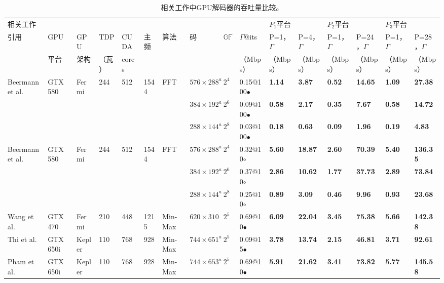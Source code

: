 \documentclass{cjc}
\begin{document}
\begin{table}
  \caption{相关工作中GPU解码器的吞吐量比较。}
  \label{tab:5}
  \small
  \setlength\tabcolsep{4pt}%
  \begin{tabular}{llllllllllllllll}
    \toprule
    相关工作&&&&&&&&&&\multicolumn{2}{l}{$P_1$平台}&\multicolumn{2}{l}{$P_2$平台}&\multicolumn{2}{l}{$P_3$平台}\\
    \cmidrule(r){11-12}\cmidrule(r){13-14}\cmidrule(r){15-16}%
    引用&GPU&GPU&TDP&CUDA&主频&算法&码&$\mathbb{GF}$&$\Gamma$@its&P=1，$\Gamma$&P=4，$\Gamma$&P=1，$\Gamma$&P=24，$\Gamma$&P=1，$\Gamma$&P=28，$\Gamma$\\
    &平台&架构&（瓦）&cores&&&&&（Mbps）&（Mbps）&（Mbps）&（Mbps）&（Mbps）&（Mbps）&（Mbps）\\
    \midrule
    Beermann et al. \cite{noauthor_beermann_nodate}&GTX 580&Fermi&244&512&1544&FFT&$576{\times}288^a$&$2^4$&0.15@100$\bullet$&\textbf{1.14}&\textbf{3.87}&\textbf{0.52}&\textbf{14.65}&\textbf{1.09}&\textbf{27.38}\\
    &&&&&&&$384{\times}192^a$&$2^6$&0.09@100$\bullet$&\textbf{0.58}&\textbf{2.17}&\textbf{0.35}&\textbf{7.67}&\textbf{0.58}&\textbf{14.72}\\
    &&&&&&&$288{\times}144^a$&$2^8$&0.03@100$\bullet$&\textbf{0.18}&\textbf{0.63}&\textbf{0.09}&\textbf{1.96}&\textbf{0.19}&\textbf{4.83}\\
    Beermann et al. \cite{beermann_gpu_2015}&GTX 580&Fermi&244&512&1544&FFT&$576{\times}288^a$&$2^4$&0.32@10$\circ$&\textbf{5.60}&\textbf{18.87}&\textbf{2.60}&\textbf{70.39}&\textbf{5.40}&\textbf{136.35}\\
    &&&&&&&$384{\times}192^a$&$2^6$&0.37@10$\circ$&\textbf{2.86}&\textbf{10.62}&\textbf{1.77}&\textbf{37.73}&\textbf{2.89}&\textbf{73.84}\\
    &&&&&&&$288{\times}144^a$&$2^8$&0.25@10$\circ$&\textbf{0.89}&\textbf{3.09}&\textbf{0.46}&\textbf{9.96}&\textbf{0.93}&\textbf{23.68}\\
    Wang et al. \cite{noauthor_wang_nodate}&GTX 470&Fermi&210&448&1215&Min-Max&$620{\times}310$&$2^5$&0.69@10$\bullet$&\textbf{6.09}&\textbf{22.04}&\textbf{3.45}&\textbf{75.38}&\textbf{5.66}&\textbf{142.38}\\
    Thi et al. \cite{noauthor_thi_nodate}&GTX 650i&Kepler&110&768&928&Min-Max&$744{\times}651^a$&$2^5$&0.09@15$\bullet$&\textbf{3.78}&\textbf{13.74}&\textbf{2.15}&\textbf{46.81}&\textbf{3.71}&\textbf{92.61}\\
    Pham et al. \cite{noauthor_pham_nodate}&GTX 650i&Kepler&110&768&928&Min-Max&$744{\times}653^a$&$2^5$&0.69@10$\bullet$&\textbf{5.91}&\textbf{21.62}&\textbf{3.41}&\textbf{73.82}&\textbf{5.77}&\textbf{145.58}\\

\end{tabular}
\end{table}
\end{document}
